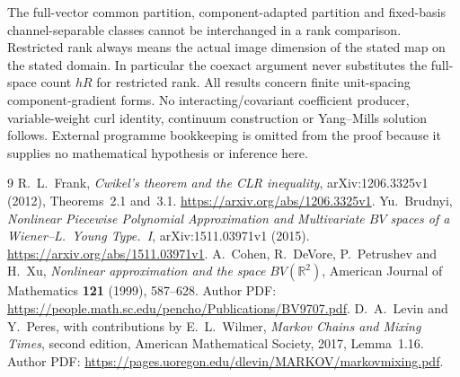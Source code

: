 \documentclass[11pt]{article}
\newcommand{\R}{\mathbb R}
\begin{document}
The full-vector common partition, component-adapted partition and fixed-basis
channel-separable classes cannot be interchanged in a rank comparison.
Restricted rank always means the actual image dimension of the stated
map on the stated domain. In particular the coexact argument never
substitutes the full-space count $hR$ for restricted rank.
All results concern finite unit-spacing component-gradient forms. No
interacting/covariant coefficient producer, variable-weight curl identity,
continuum construction or Yang--Mills solution follows. External programme
bookkeeping is omitted from the proof because it supplies no mathematical
hypothesis or inference here.





\appendix



\begin{thebibliography}{9}
\small\setlength{\itemsep}{2pt}
 R.~L.~Frank,
\emph{Cwikel's theorem and the CLR inequality}, arXiv:1206.3325v1 (2012),
Theorems~2.1 and~3.1. \url{https://arxiv.org/abs/1206.3325v1}.
 Yu.~Brudnyi,
\emph{Nonlinear Piecewise Polynomial Approximation and Multivariate $BV$
spaces of a Wiener--L.~Young Type.~I}, arXiv:1511.03971v1 (2015).
\url{https://arxiv.org/abs/1511.03971v1}.
 A.~Cohen, R.~DeVore, P.~Petrushev and H.~Xu,
\emph{Nonlinear approximation and the space $BV(\R^2)$},
American Journal of Mathematics \textbf{121} (1999), 587--628.
Author PDF: \url{https://people.math.sc.edu/pencho/Publications/BV9707.pdf}.
 D.~A.~Levin and Y.~Peres, with contributions by
E.~L.~Wilmer, \emph{Markov Chains and Mixing Times}, second edition,
American Mathematical Society, 2017, Lemma~1.16.
Author PDF: \url{https://pages.uoregon.edu/dlevin/MARKOV/markovmixing.pdf}.\end{thebibliography}
\end{document}
